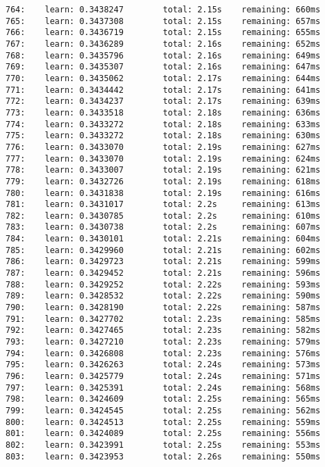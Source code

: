 \documentclass[11pt]{article}
\begin{document}
\begin{Verbatim}[commandchars=\\\{\}]
764:    learn: 0.3438247        total: 2.15s    remaining: 660ms
765:    learn: 0.3437308        total: 2.15s    remaining: 657ms
766:    learn: 0.3436719        total: 2.15s    remaining: 655ms
767:    learn: 0.3436289        total: 2.16s    remaining: 652ms
768:    learn: 0.3435796        total: 2.16s    remaining: 649ms
769:    learn: 0.3435307        total: 2.16s    remaining: 647ms
770:    learn: 0.3435062        total: 2.17s    remaining: 644ms
771:    learn: 0.3434442        total: 2.17s    remaining: 641ms
772:    learn: 0.3434237        total: 2.17s    remaining: 639ms
773:    learn: 0.3433518        total: 2.18s    remaining: 636ms
774:    learn: 0.3433272        total: 2.18s    remaining: 633ms
775:    learn: 0.3433272        total: 2.18s    remaining: 630ms
776:    learn: 0.3433070        total: 2.19s    remaining: 627ms
777:    learn: 0.3433070        total: 2.19s    remaining: 624ms
778:    learn: 0.3433007        total: 2.19s    remaining: 621ms
779:    learn: 0.3432726        total: 2.19s    remaining: 618ms
780:    learn: 0.3431838        total: 2.19s    remaining: 616ms
781:    learn: 0.3431017        total: 2.2s     remaining: 613ms
782:    learn: 0.3430785        total: 2.2s     remaining: 610ms
783:    learn: 0.3430738        total: 2.2s     remaining: 607ms
784:    learn: 0.3430101        total: 2.21s    remaining: 604ms
785:    learn: 0.3429960        total: 2.21s    remaining: 602ms
786:    learn: 0.3429723        total: 2.21s    remaining: 599ms
787:    learn: 0.3429452        total: 2.21s    remaining: 596ms
788:    learn: 0.3429252        total: 2.22s    remaining: 593ms
789:    learn: 0.3428532        total: 2.22s    remaining: 590ms
790:    learn: 0.3428190        total: 2.22s    remaining: 587ms
791:    learn: 0.3427702        total: 2.23s    remaining: 585ms
792:    learn: 0.3427465        total: 2.23s    remaining: 582ms
793:    learn: 0.3427210        total: 2.23s    remaining: 579ms
794:    learn: 0.3426808        total: 2.23s    remaining: 576ms
795:    learn: 0.3426263        total: 2.24s    remaining: 573ms
796:    learn: 0.3425779        total: 2.24s    remaining: 571ms
797:    learn: 0.3425391        total: 2.24s    remaining: 568ms
798:    learn: 0.3424609        total: 2.25s    remaining: 565ms
799:    learn: 0.3424545        total: 2.25s    remaining: 562ms
800:    learn: 0.3424513        total: 2.25s    remaining: 559ms
801:    learn: 0.3424089        total: 2.25s    remaining: 556ms
802:    learn: 0.3423991        total: 2.25s    remaining: 553ms
803:    learn: 0.3423953        total: 2.26s    remaining: 550ms

\end{Verbatim}
\end{document}

